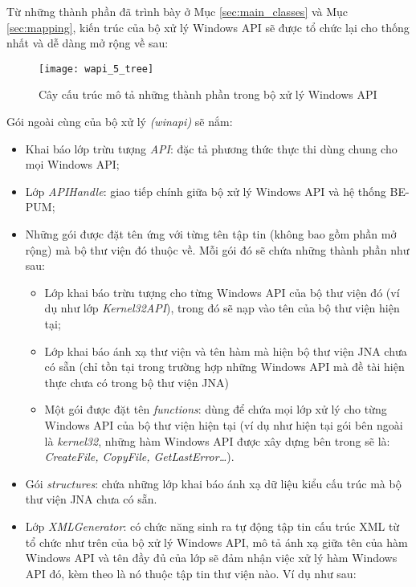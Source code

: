 Từ những thành phần đã trình bày ở Mục \ref{sec:main_classes} và Mục \ref{sec:mapping}, kiến trúc của bộ xử lý Windows API sẽ được tổ chức lại cho thống nhất và dễ dàng mở rộng về sau:

	\begin{figure}[H]
	\centering
		\texttt{[image: wapi\_5\_tree]}
		\caption{Cây cấu trúc mô tả những thành phần trong bộ xử lý Windows API}	
		\label{fig:wapi_5_tree}		
	\end{figure}

Gói ngoài cùng của bộ xử lý \textit{(winapi)} sẽ nắm:

\begin{itemize}
	\item Khai báo lớp trừu tượng \textit{API}: đặc tả phương thức thực thi dùng chung cho mọi Windows API;

	\item Lớp \textit{APIHandle}: giao tiếp chính giữa bộ xử lý Windows API và hệ thống BE-PUM;

	\item Những gói được đặt tên ứng với từng tên tập tin (không bao gồm phần mở rộng) mà bộ thư viện đó thuộc về. Mỗi gói đó sẽ chứa những thành phần như sau:

	\begin{itemize}
		\item Lớp khai báo trừu tượng cho từng Windows API của bộ thư viện đó (ví dụ như lớp \textit{Kernel32API}), trong đó sẽ nạp vào tên của bộ thư viện hiện tại;

		\item Lớp khai báo ánh xạ thư viện và tên hàm mà hiện bộ thư viện JNA chưa có sẵn (chỉ tồn tại trong trường hợp những Windows API mà đề tài hiện thực chưa có trong bộ thư viện JNA)

		\item Một gói được đặt tên \textit{functions}: dùng để chứa mọi lớp xử lý cho từng Windows API của bộ thư viện hiện tại (ví dụ như hiện tại gói bên ngoài là \textit{kernel32}, những hàm Windows API được xây dựng bên trong sẽ là: \textit{CreateFile, CopyFile, GetLastError…}).
	\end{itemize}

	\item Gói \textit{structures}: chứa những lớp khai báo ánh xạ dữ liệu kiểu cấu trúc mà bộ thư viện JNA chưa có sẵn.

	\item Lớp \textit{XMLGenerator}: có chức năng sinh ra tự động tập tin cấu trúc XML từ tổ chức như trên của bộ xử lý Windows API, mô tả ánh xạ giữa tên của hàm Windows API và tên đầy đủ của lớp sẽ đảm nhận việc xử lý hàm Windows API đó, kèm theo là nó thuộc tập tin thư viện nào. Ví dụ như sau:\\



\end{itemize}
